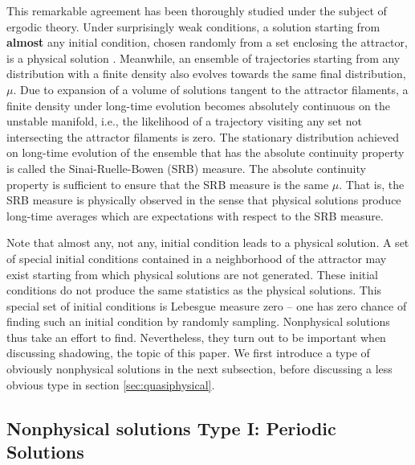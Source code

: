 \documentclass[preprint,12pt]{elsarticle}
\begin{document}
This remarkable agreement has been thoroughly studied under the subject
of ergodic theory. Under surprisingly weak conditions, a solution starting from
{\bf almost} any initial condition, chosen randomly from a set enclosing the attractor, is a physical solution \cite{young}.   
Meanwhile, an ensemble of trajectories starting from any distribution with a 
finite density also evolves towards the same final distribution, $\mu$. Due to expansion of a volume of solutions tangent to the attractor filaments, a finite density under long-time evolution becomes absolutely continuous on the unstable manifold, i.e., the likelihood of a trajectory visiting any set not intersecting the attractor filaments is zero. The 
stationary distribution achieved on long-time evolution of the ensemble that has the absolute continuity property is called the Sinai-Ruelle-Bowen
(SRB) measure. The absolute continuity property is sufficient to ensure that the SRB measure is the same $\mu.$ That is, the SRB measure is physically observed in the sense that physical solutions produce long-time averages which are expectations with respect to the SRB measure. 

Note that almost any, not any, initial condition leads to a physical solution. A set of special initial conditions
contained in a neighborhood of the attractor may exist starting from which physical solutions are not generated. These initial conditions do not produce the same statistics as the physical solutions. This special set of initial conditions is Lebesgue measure zero -- one
has zero chance of finding such an initial condition by randomly sampling.
Nonphysical solutions thus take an effort to find.  Nevertheless, they
turn out to be important when discussing shadowing, the topic of this paper.
We first introduce a type of obviously nonphysical solutions in the next
subsection, before discussing a less obvious type in section \ref{sec:quasiphysical}.

\subsection{Nonphysical solutions Type I: Periodic Solutions}
\end{document}
